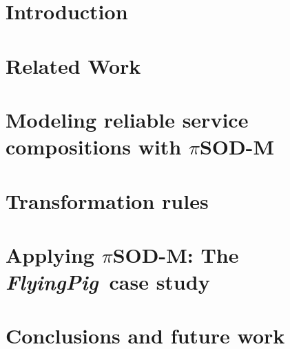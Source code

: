\documentclass{ws-ijseke}
\newcommand{\pisodm}[0]{$\pi$SOD-M\xspace}
\def\FlyingPig{\textsl{FlyingPig}\xspace}
\begin{document}
\begin{abstract}
Specifying non-functional requirements (NFRs) is a complex task, being usually dealt with on the later phases of the software process.
The late inclusion of NFRs in the development may compromise the quality of the deployed application.
This paper presents \pisodm, a method and associated tools that
\textit{(i)}  allows the early specification of non-functional requirements in a principled way: users are abstracted away from low level details;
\textit{(ii)} embraces the MDA philosophy, generating models (code) whenever possible.
The pro\-po\-sed solution has been utilized in the context of an industrial and real case study.
\end{abstract}



\section{Introduction}
\label{sec:intro}


\section{Related Work}
\label{sec:relworks}


\section{Modeling reliable service compositions with \pisodm}\label{sec:motivation}


\section{Transformation rules}\label{sec:mmrules}


\section{Applying \pisodm: The \FlyingPig\ case study}
\label{sec:flyingPig}



\section{Conclusions and future work}\label{sec:conclusions}





\end{document}
